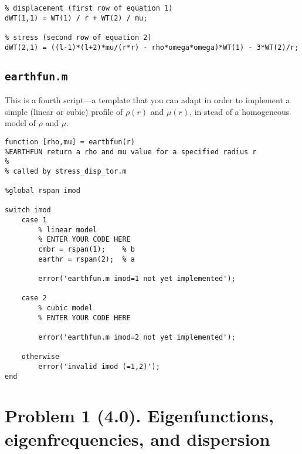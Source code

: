 \documentclass[11pt,titlepage,fleqn]{article}
\begin{document}
\begin{spacing}{1.0}
\begin{verbatim}
% displacement (first row of equation 1)
dWT(1,1) = WT(1) / r + WT(2) / mu;

% stress (second row of equation 2)
dWT(2,1) = ((l-1)*(l+2)*mu/(r*r) - rho*omega*omega)*WT(1) - 3*WT(2)/r;
\end{verbatim}
\normalsize


\subsection{\tt earthfun.m}
\label{sec:earthfun}

This is a fourth script---a template that you can adapt in order to implement a simple (linear or cubic) profile of $\rho(r)$ and $\mu(r)$, in stead of a homogeneous model of $\rho$ and $\mu$.
%
\small
\begin{verbatim}
function [rho,mu] = earthfun(r)
%EARTHFUN return a rho and mu value for a specified radius r
%
% called by stress_disp_tor.m

%global rspan imod

switch imod
    case 1
        % linear model
        % ENTER YOUR CODE HERE
        cmbr = rspan(1);    % b
        earthr = rspan(2);  % a
        
        error('earthfun.m imod=1 not yet implemented');
        
    case 2
        % cubic model
        % ENTER YOUR CODE HERE
        
        error('earthfun.m imod=2 not yet implemented');
    
    otherwise
        error('invalid imod (=1,2)');
end
\end{verbatim}
\normalsize

\end{spacing}



\pagebreak
\section*{Problem 1 (4.0). Eigenfunctions, eigenfrequencies, and dispersion}
\end{document}
